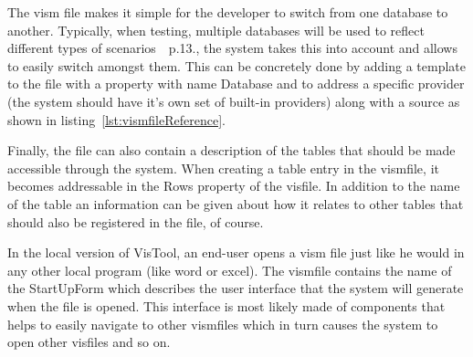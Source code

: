 The vism file makes it simple for the developer to switch from one database to another. Typically, when testing, multiple databases will be used to reflect different types of scenarios~\cite{lauesen2013}~p.13., the system takes this into account and allows to easily switch amongst them. This can be concretely done by adding a template to the file with a property with name Database and to address a specific provider (the system should have it's own set of built-in providers) along with a source as shown in listing~\ref{lst:vismfileReference}.

Finally, the file can also contain a description of the tables that should be made accessible through the system. When creating a table entry in the vismfile, it becomes addressable in the Rows property of the visfile. In addition to the name of the table an information can be given about how it relates to other tables that should also be registered in the file, of course.

In the local version of VisTool, an end-user opens a vism file just like he would in any other local program (like word or excel). The vismfile contains the name of the StartUpForm which describes the user interface that the system will generate when the file is opened. This interface is most likely made of components that helps to easily navigate to other vismfiles which in turn causes the system to open other visfiles and so on.
